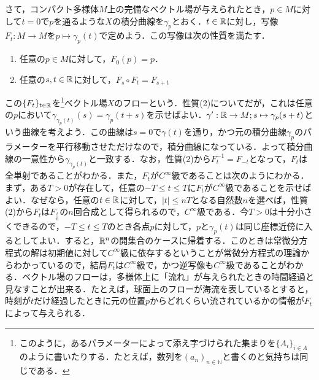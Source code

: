 さて，コンパクト多様体$M$上の完備なベクトル場が与えられたとき，$p\in M$に対して$t=0$で$p$を通るような$X$の積分曲線を$\gamma_p$とおく．$t\in{\mathbb R}$に対し，写像$F_t:M\rightarrow M$を$p\mapsto \gamma_p(t)$で定めよう．この写像は次の性質を満たす．
\begin{enumerate}
\renewcommand{\labelenumi}{(\theenumi)}
\item 任意の$p\in M$に対して，$F_0(p)=p$．
\item 任意の$s,t\in{\mathbb R}$に対して，$F_s\circ F_t=F_{s+t}$
\end{enumerate}
この$\{F_t\}_{t\in{\mathbb R}}$を\footnote{このように，あるパラメーターによって添え字づけられた集まりを$\{A_i\}_{i\in \Lambda}$のように書いたりする．たとえば，数列を$(a_n)_{n\in {\mathbb N}}$と書くのと気持ちは同じである．}ベクトル場$X$のフローという．性質(2)についてだが，これは任意の$p$において$\gamma_{\gamma_p(t)}(s)=\gamma_p(t+s)$を示せばよい．$\gamma':{\mathbb R}\rightarrow M;s\mapsto\gamma_p(s+t)$という曲線を考えよう．この曲線は$s=0$で$\gamma(t)$を通り，かつ元の積分曲線$\gamma_p$のパラメーターを平行移動させただけなので，積分曲線になっている．よって積分曲線の一意性から$\gamma_{\gamma_p(t)}$と一致する．なお，性質(2)から$F_t^{-1}=F_{-t}$となって，$F_t$は全単射であることがわかる．また，$F_t$が$C^\infty$級であることは次のようにわかる．まず，ある$T>0$が存在して，任意の$-T\le t\le T$に$F_t$が$C^\infty$級であることを示せばよい．なぜなら，任意の$t\in{\mathbb R}$に対して，$|t| \le nT$となる自然数$n$を選べば，性質(2)から$F_t$は$F_{\frac{t}{n}}$の$n$回合成として得られるので，$C^\infty$級である．今$T>0$は十分小さくできるので，$-T\le t \le T$のとき各点$p$に対して，$p$と$\gamma_p(t)$は同じ座標近傍に入るとしてよい．すると，${\mathbb R}^n$の開集合のケースに帰着する．このときは常微分方程式の解は初期値に対して$C^\infty$級に依存するということが常微分方程式の理論からわかっているので，結局$F_t$は$C^\infty$級で，かつ逆写像も$C^\infty$級であることがわかる．ベクトル場のフローは，多様体上に「流れ」が与えられたときの時間経過と見なすことが出来る．たとえば，球面上のフローが海流を表しているとすると，時刻が$t$だけ経過したときに元の位置$p$からどれくらい流されているかの情報が$F_t$によって与えられる．


